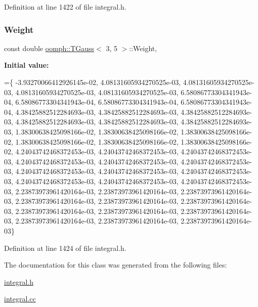 Definition at line 1422 of file integral.\+h.

\mbox{\label{classoomph_1_1TGauss_3_013_00_015_01_4_a98442d62e5713d76f54adfd7f567bebb}} 
\subsubsection{\texorpdfstring{Weight}{Weight}}
{\footnotesize\ttfamily const double \hyperlink{classoomph_1_1TGauss}{oomph\+::\+T\+Gauss}$<$ 3, 5 $>$\+::Weight\hspace{0.3cm}{\ttfamily [static]}, {\ttfamily [private]}}

{\bfseries Initial value\+:}
\begin{DoxyCode}
=\{
-3.93270066412926145e-02,  4.08131605934270525e-03, 
 4.08131605934270525e-03,  4.08131605934270525e-03, 
 4.08131605934270525e-03,  6.58086773304341943e-04, 
 6.58086773304341943e-04,  6.58086773304341943e-04, 
 6.58086773304341943e-04,  4.38425882512284693e-03, 
 4.38425882512284693e-03,  4.38425882512284693e-03, 
 4.38425882512284693e-03,  4.38425882512284693e-03, 
 4.38425882512284693e-03,  1.38300638425098166e-02, 
 1.38300638425098166e-02,  1.38300638425098166e-02, 
 1.38300638425098166e-02,  1.38300638425098166e-02, 
 1.38300638425098166e-02,  4.24043742468372453e-03, 
 4.24043742468372453e-03,  4.24043742468372453e-03, 
 4.24043742468372453e-03,  4.24043742468372453e-03, 
 4.24043742468372453e-03,  4.24043742468372453e-03, 
 4.24043742468372453e-03,  4.24043742468372453e-03, 
 4.24043742468372453e-03,  4.24043742468372453e-03, 
 4.24043742468372453e-03,  2.23873973961420164e-03, 
 2.23873973961420164e-03,  2.23873973961420164e-03, 
 2.23873973961420164e-03,  2.23873973961420164e-03, 
 2.23873973961420164e-03,  2.23873973961420164e-03, 
 2.23873973961420164e-03,  2.23873973961420164e-03, 
 2.23873973961420164e-03,  2.23873973961420164e-03, 
 2.23873973961420164e-03\}
\end{DoxyCode}


Definition at line 1424 of file integral.\+h.



The documentation for this class was generated from the following files\+:\begin{DoxyCompactItemize}
\item 
\hyperlink{integral_8h}{integral.\+h}\item 
\hyperlink{integral_8cc}{integral.\+cc}\end{DoxyCompactItemize}
